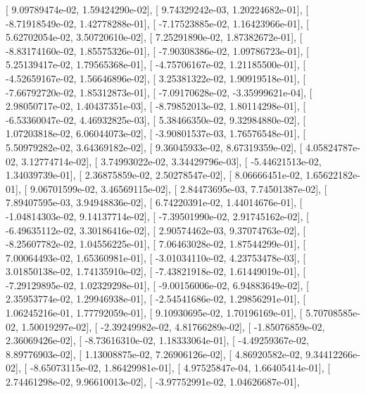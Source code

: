 \documentclass{article}
\begin{document}
       [  9.09789474e-02,   1.59424290e-02],
       [  9.74329242e-03,   1.20224682e-01],
       [ -8.71918549e-02,   1.42778288e-01],
       [ -7.17523885e-02,   1.16423966e-01],
       [  5.62702054e-02,   3.50720610e-02],
       [  7.25291890e-02,   1.87382672e-01],
       [ -8.83174160e-02,   1.85575326e-01],
       [ -7.90308386e-02,   1.09786723e-01],
       [  5.25139417e-02,   1.79565368e-01],
       [ -4.75706167e-02,   1.21185500e-01],
       [ -4.52659167e-02,   1.56646896e-02],
       [  3.25381322e-02,   1.90919518e-01],
       [ -7.66792720e-02,   1.85312873e-01],
       [ -7.09170628e-02,  -3.35999621e-04],
       [  2.98050717e-02,   1.40437351e-03],
       [ -8.79852013e-02,   1.80114298e-01],
       [ -6.53360047e-02,   4.46932825e-03],
       [  5.38466350e-02,   9.32984880e-02],
       [  1.07203818e-02,   6.06044073e-02],
       [ -3.90801537e-03,   1.76576548e-01],
       [  5.50979282e-02,   3.64369182e-02],
       [  9.36045933e-02,   8.67319359e-02],
       [  4.05824787e-02,   3.12774714e-02],
       [  3.74993022e-02,   3.34429796e-03],
       [ -5.44621513e-02,   1.34039739e-01],
       [  2.36875859e-02,   2.50278547e-02],
       [  8.06666451e-02,   1.65622182e-01],
       [  9.06701599e-02,   3.46569115e-02],
       [  2.84473695e-03,   7.74501387e-02],
       [  7.89407595e-03,   3.94948836e-02],
       [  6.74220391e-02,   1.44014676e-01],
       [ -1.04814303e-02,   9.14137714e-02],
       [ -7.39501990e-02,   2.91745162e-02],
       [ -6.49635112e-02,   3.30186416e-02],
       [  2.90574462e-03,   9.37074763e-02],
       [ -8.25607782e-02,   1.04556225e-01],
       [  7.06463028e-02,   1.87544299e-01],
       [  7.00064493e-02,   1.65360981e-01],
       [ -3.01034110e-02,   4.23753478e-03],
       [  3.01850138e-02,   1.74135910e-02],
       [ -7.43821918e-02,   1.61449019e-01],
       [ -7.29129895e-02,   1.02329298e-01],
       [ -9.00156006e-02,   6.94883649e-02],
       [  2.35953774e-02,   1.29946938e-01],
       [ -2.54541686e-02,   1.29856291e-01],
       [  1.06245216e-01,   1.77792059e-01],
       [  9.10930695e-02,   1.70196169e-01],
       [  5.70708585e-02,   1.50019297e-02],
       [ -2.39249982e-02,   4.81766289e-02],
       [ -1.85076859e-02,   2.36069426e-02],
       [ -8.73616310e-02,   1.18333064e-01],
       [ -4.49259367e-02,   8.89776903e-02],
       [  1.13008875e-02,   7.26906126e-02],
       [  4.86920582e-02,   9.34412266e-02],
       [ -8.65073115e-02,   1.86429981e-01],
       [  4.97525847e-04,   1.66405414e-01],
       [  2.74461298e-02,   9.96610013e-02],
       [ -3.97752991e-02,   1.04626687e-01],
\end{document}

